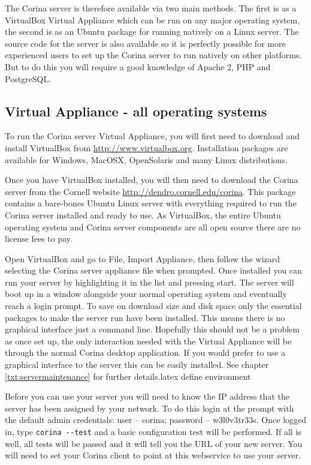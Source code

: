 The Corina server is therefore available via two main methods.  The first is as a VirtualBox Virtual Appliance which can be run on any major operating system, the second is as an Ubuntu package for running natively on a Linux server.  The source code for the server is also available so it is perfectly possible for more experienced users to set up the Corina server to run natively on other platforms.  But to do this you will require a good knowledge of Apache 2, PHP and PostgreSQL.

\subsection{Virtual Appliance - all operating systems}
\label{txt:virtualAppliance}
To run the Corina server Virtual Appliance, you will first need to download and install VirtualBox from \url{http://www.virtualbox.org}.  Installation packages are available for Windows, MacOSX, OpenSolaris and many Linux distributions.

Once you have VirtualBox installed, you will then need to download the Corina server from the Cornell website \url{http://dendro.cornell.edu/corina}.  This package contains a bare-bones Ubuntu Linux server with everything required to run the Corina server installed and ready to use.  As VirtualBox, the entire Ubuntu operating system and Corina server components are all open source there are no license fees to pay.

Open VirtualBox and go to File, Import Appliance, then follow the wizard selecting the Corina server appliance file when prompted.  Once installed you can run your server by highlighting it in the list and pressing start.  The server will boot up in a window alongside your normal operating system and eventually reach a login prompt.  To save on download size and disk space only the essential packages to make the server run have been installed.  This means there is no graphical interface just a command line.  Hopefully this should not be a problem as once set up, the only interaction needed with the Virtual Appliance will be through the normal Corina desktop application.  If you would prefer to use a graphical interface to the server this can be easily installed.  See chapter \ref{txt:servermaintenance} for further details.latex define environment

Before you can use your server you will need to know the IP address that the server has been assigned by your network.  To do this login at the prompt with the default admin credentials: user -- corina; password -- w3l0v3tr33s.  Once logged in, type \verb|corina --test| and a basic configuration test will be performed.  If all is well, all tests will be passed and it will tell you the URL of your new server.  You will need to set your Corina client to point at this webservice to use your server.



